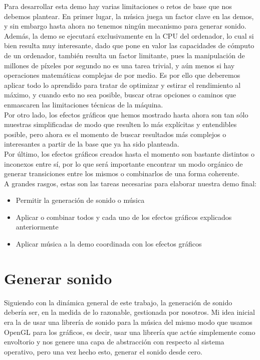 Para desarrollar esta demo hay varias limitaciones o retos de base que nos debemos plantear. En primer lugar, la música juega un factor clave en las demos, y sin embargo hasta ahora no tenemos ningún mecanismo para generar sonido.\\

Además, la demo se ejecutará exclusivamente en la CPU del ordenador, lo cual si bien resulta muy interesante, dado que pone en valor las capacidades de cómputo de un ordenador, también resulta un factor limitante, pues la manipulación de millones de píxeles por segundo no es una tarea trivial, y aún menos si hay operaciones matemáticas complejas de por medio. Es por ello que deberemos aplicar todo lo aprendido para tratar de optimizar y estirar el rendimiento al máximo, y cuando esto no sea posible, buscar otras opciones o caminos que enmascaren las limitaciones técnicas de la máquina.\\

Por otro lado, los efectos gráficos que hemos mostrado hasta ahora son tan sólo muestras simplificadas de modo que resulten lo más explícitas y entendibles posible, pero ahora es el momento de buscar resultados más complejos o interesantes a partir de la base que ya ha sido planteada.\\

Por último, los efectos gráficos creados hasta el momento son bastante distintos o inconexos entre sí, por lo que será importante encontrar un modo orgánico de generar transiciones entre los mismos o combinarlos de una forma coherente.\\

A grandes rasgos, estas son las tareas necesarias para elaborar nuestra demo final:

\begin{itemize}
	\item Permitir la generación de sonido o música
	\item Aplicar o combinar todos y cada uno de los efectos gráficos explicados anteriormente
	\item Aplicar música a la demo coordinada con los efectos gráficos
\end{itemize}

\section{Generar sonido}

Siguiendo con la dinámica general de este trabajo, la generación de sonido debería ser, en la medida de lo razonable, gestionada por nosotros. Mi idea inicial era la de usar una librería de sonido para la música del mismo modo que usamos OpenGL para los gráficos, es decir, usar una librería que actúe simplemente como envoltorio y nos genere una capa de abstracción con respecto al sistema operativo, pero una vez hecho esto, generar el sonido desde cero.\\

